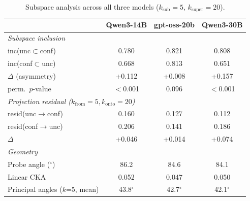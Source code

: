 \documentclass[11pt]{article}
\begin{document}
\begin{table}[H]
\caption{Subspace analysis across all three models ($k_{\text{sub}}=5$, $k_{\text{super}}=20$).}
\label{tab:app_subspace}
\begin{center}
\begin{small}
\begin{tabular}{lccc}
\toprule
& \textbf{Qwen3-14B} & \textbf{gpt-oss-20b} & \textbf{Qwen3-30B} \\
\midrule
\multicolumn{4}{l}{\textit{Subspace inclusion}} \\
\quad inc(unc$\subset$conf) & 0.780 & 0.821 & 0.808 \\
\quad inc(conf$\subset$unc) & 0.668 & 0.813 & 0.651 \\
\quad $\Delta$ (asymmetry) & +0.112 & +0.008 & +0.157 \\
\quad perm.\ $p$-value & $<$0.001 & 0.096 & $<$0.001 \\
\midrule
\multicolumn{4}{l}{\textit{Projection residual ($k_{\text{from}}=5, k_{\text{onto}}=20$)}} \\
\quad resid(unc$\to$conf) & 0.160 & 0.127 & 0.112 \\
\quad resid(conf$\to$unc) & 0.206 & 0.141 & 0.186 \\
\quad $\Delta$ & +0.046 & +0.014 & +0.074 \\
\midrule
\multicolumn{4}{l}{\textit{Geometry}} \\
\quad Probe angle ($^\circ$) & 86.2 & 84.6 & 84.1 \\
\quad Linear CKA & 0.052 & 0.047 & 0.050 \\
\quad Principal angles ($k$=5, mean) & 43.8$^\circ$ & 42.7$^\circ$ & 42.1$^\circ$ \\
\bottomrule
\end{tabular}
\end{small}
\end{center}
\end{table}
\end{document}
